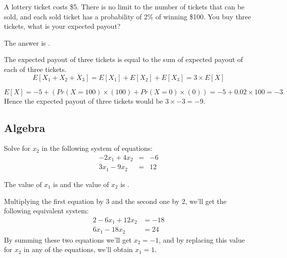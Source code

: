 \documentclass{ximera}
\begin{document}
\begin{question}
A lottery ticket costs \$5. 
There is no limit to the number of tickets that can be sold, and each sold ticket has a probability of 2\% of winning \$100.
You buy three tickets, what is your expected payout?

\begin{solution}
The answer is .
\end{solution}

The expected payout of three tickets is equal to the sum of expected payout of each of three tickets. 
\begin{equation*}
E[X_1 + X_2 + X_3] = E[X_1] + E[X_2] + E[X_3] = 3 \times E[X]
\end{equation*}

\begin{equation*}
E[X] = -5 + \left(Pr(X = 100) \times (100) + Pr(X = 0) \times (0)\right) = -5 + 0.02 \times 100 = -3
\end{equation*}
Hence the expected payout of three tickets would be $3 \times -3 = -9$.
\end{question}


\subsection*{Algebra}

\begin{question}
Solve for $x_2$ in the following system of equations:
\begin{eqnarray*}
-2x_1 + 4x_2 & = &-6\\
3x_1  - 9x_2 & = & 12 
\end{eqnarray*}
\vspace*{13pt}
\begin{solution}
The value of $x_1$ is  and the value of $x_2$ is .
\end{solution}
Multiplying the first equation by 3 and the second one by 2, we'll get the following equivalent system:
\begin{alignat*}{2}
 -6  x_1  + 12  x_2 & = -18 \\
 6  x_1  - 18  x_2 & = 24
\end{alignat*}
By summing these two equations we'll get $x_2 = -1$, and by replacing this value for $x_2$ in any of the equations, we'll obtain $x_1 = 1$.
\end{question}
\end{document}
